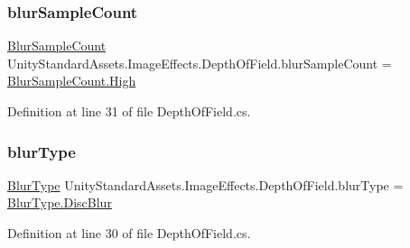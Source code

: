 \subsubsection{\texorpdfstring{blur\+Sample\+Count}{blurSampleCount}}
{\footnotesize\ttfamily \mbox{\hyperlink{class_unity_standard_assets_1_1_image_effects_1_1_depth_of_field_abd4e71b10ed1bbe087a4f15b735bb77b}{Blur\+Sample\+Count}} Unity\+Standard\+Assets.\+Image\+Effects.\+Depth\+Of\+Field.\+blur\+Sample\+Count = \mbox{\hyperlink{class_unity_standard_assets_1_1_image_effects_1_1_depth_of_field_abd4e71b10ed1bbe087a4f15b735bb77ba655d20c1ca69519ca647684edbb2db35}{Blur\+Sample\+Count.\+High}}}



Definition at line 31 of file Depth\+Of\+Field.\+cs.

\mbox{\label{class_unity_standard_assets_1_1_image_effects_1_1_depth_of_field_aa2b567bd047507f170c15dedc44cb50d}} 
\subsubsection{\texorpdfstring{blur\+Type}{blurType}}
{\footnotesize\ttfamily \mbox{\hyperlink{class_unity_standard_assets_1_1_image_effects_1_1_depth_of_field_ab7aaacbb098cf0b20da9d9b6e502d7c7}{Blur\+Type}} Unity\+Standard\+Assets.\+Image\+Effects.\+Depth\+Of\+Field.\+blur\+Type = \mbox{\hyperlink{class_unity_standard_assets_1_1_image_effects_1_1_depth_of_field_ab7aaacbb098cf0b20da9d9b6e502d7c7a26d395bd59cbf7cded165ca9e16d534b}{Blur\+Type.\+Disc\+Blur}}}



Definition at line 30 of file Depth\+Of\+Field.\+cs.

\mbox{\label{class_unity_standard_assets_1_1_image_effects_1_1_depth_of_field_ab63083979e9b67f76bec3680649c1180}} 
